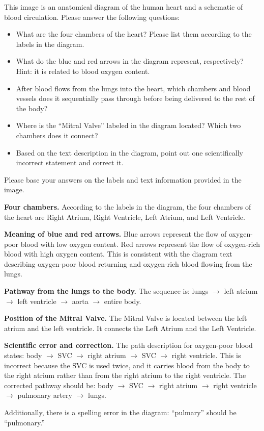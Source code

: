 \begin{caseprompt}
This image is an anatomical diagram of the human heart and a schematic of blood circulation. Please answer the following questions:
\begin{itemize}[leftmargin=1.6em,itemsep=0.15em,topsep=0.25em]
  \item What are the four chambers of the heart? Please list them according to the labels in the diagram.
  \item What do the blue and red arrows in the diagram represent, respectively? Hint: it is related to blood oxygen content.
  \item After blood flows from the lungs into the heart, which chambers and blood vessels does it sequentially pass through before being delivered to the rest of the body?
  \item Where is the ``Mitral Valve'' labeled in the diagram located? Which two chambers does it connect?
  \item Based on the text description in the diagram, point out one scientifically incorrect statement and correct it.
\end{itemize}
Please base your answers on the labels and text information provided in the image.
\end{caseprompt}

\begin{caseresponse}
\textbf{Four chambers.} According to the labels in the diagram, the four chambers of the heart are Right Atrium, Right Ventricle, Left Atrium, and Left Ventricle.

\textbf{Meaning of blue and red arrows.} Blue arrows represent the flow of oxygen-poor blood with low oxygen content. Red arrows represent the flow of oxygen-rich blood with high oxygen content. This is consistent with the diagram text describing oxygen-poor blood returning and oxygen-rich blood flowing from the lungs.

\textbf{Pathway from the lungs to the body.} The sequence is: lungs \(\rightarrow\) left atrium \(\rightarrow\) left ventricle \(\rightarrow\) aorta \(\rightarrow\) entire body.

\textbf{Position of the Mitral Valve.} The Mitral Valve is located between the left atrium and the left ventricle. It connects the Left Atrium and the Left Ventricle.

\textbf{Scientific error and correction.} The path description for oxygen-poor blood states: body \(\rightarrow\) SVC \(\rightarrow\) right atrium \(\rightarrow\) SVC \(\rightarrow\) right ventricle. This is incorrect because the SVC is used twice, and it carries blood from the body to the right atrium rather than from the right atrium to the right ventricle. The corrected pathway should be: body \(\rightarrow\) SVC \(\rightarrow\) right atrium \(\rightarrow\) right ventricle \(\rightarrow\) pulmonary artery \(\rightarrow\) lungs.

Additionally, there is a spelling error in the diagram: ``pulmary'' should be ``pulmonary.''
\end{caseresponse}

